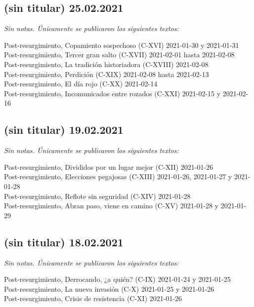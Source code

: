\documentclass[
]{book}
\begin{document}
\hypertarget{sin-titular-25.02.2021}{%
\subsection*{(sin titular) 25.02.2021}\label{sin-titular-25.02.2021}}

\emph{Sin notas. Únicamente se publicaron los siguientes textos:}

Post-resurgimiento, Copamiento sospechoso (C-XVI) 2021-01-30 y 2021-01-31~\\
Post-resurgimiento, Tercer gran salto (C-XVII) 2021-02-01 hasta 2021-02-08~\\
Post-resurgimiento, La tradición historiadora (C-XVIII) 2021-02-08~\\
Post-resurgimiento, Perdición (C-XIX) 2021-02-08 hasta 2021-02-13~\\
Post-resurgimiento, El día rojo (C-XX) 2021-02-14~\\
Post-resurgimiento, Incomunicados entre rozados (C-XXI) 2021-02-15 y 2021-02-16

\hypertarget{sin-titular-19.02.2021}{%
\subsection*{(sin titular) 19.02.2021}\label{sin-titular-19.02.2021}}

\emph{Sin notas. Únicamente se publicaron los siguientes textos:}

Post-resurgimiento, Divididos por un lugar mejor (C-XII) 2021-01-26~\\
Post-resurgimiento, Elecciones pegajosas (C-XIII) 2021-01-26, 2021-01-27 y 2021-01-28~\\
Post-resurgimiento, Reflote sin seguridad (C-XIV) 2021-01-28~\\
Post-resurgimiento, Abran paso, viene en camino (C-XV) 2021-01-28 y 2021-01-29

\hypertarget{sin-titular-18.02.2021}{%
\subsection*{(sin titular) 18.02.2021}\label{sin-titular-18.02.2021}}

\emph{Sin notas. Únicamente se publicaron los siguientes textos:}

Post-resurgimiento, Derrocando, ¿a quién? (C-IX) 2021-01-24 y 2021-01-25~\\
Post-resurgimiento, La nueva invasión (C-X) 2021-01-25 y 2021-01-26~\\
Post-resurgimiento, Crisis de resistencia (C-XI) 2021-01-26
\end{document}
